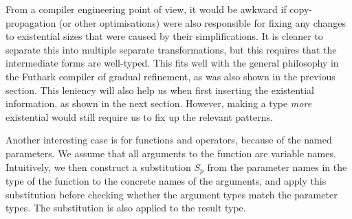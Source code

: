 From a compiler engineering point of view, it would be awkward if
copy-propagation (or other optimisations) were also responsible for
fixing any changes to existential sizes that were caused by their
simplifications.  It is cleaner to separate this into multiple
separate transformations, but this requires that the intermediate
forms are well-typed.  This fits well with the general philosophy in
the Futhark compiler of gradual refinement, as was also shown in the
previous section.  This leniency will also help us when first
inserting the existential information, as shown in the next section.
However, making a type \textit{more} existential would still require
us to fix up the relevant patterns.

Another interesting case is for functions and operators, because of
the named parameters.  We assume that all arguments to the function
are variable names.  Intuitively, we then construct a substitution
$S_{p}$ from the parameter names in the type of the function to the
concrete names of the arguments, and apply this substitution before
checking whether the argument types match the parameter types.  The
substitution is also applied to the result type.

